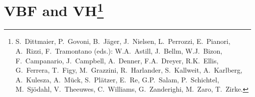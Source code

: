 \providecommand{\muR}{\mathswitch {\mu_{\mathrm{R}}}}
\providecommand{\muF}{\mathswitch {\mu_{\mathrm{F}}}}
\providecommand\DY{\mathrm{DY}}
\providecommand\DIS{\mathrm{DIS}}
\providecommand\VBF{\mathrm{VBF}}
\providecommand\NLL{\mathrm{NLL}}
\providecommand\VH{\mathrm{VH}}
\providecommand\WH{\mathrm{WH}}
\providecommand\ZH{\mathrm{ZH}}
\providecommand\ELWK{\mathrm{EW}}
\providecommand\HAWK{{\sc HAWK}}
\providecommand\MCFM{{\sc MCFM}}
\providecommand\VBFNLO{{\sc VBFNLO}}
\providecommand\VHNNLO{{\sc VH@NNLO}}
\providecommand\vhnnlo{{\sc VHNNLO}}
\providecommand\POWHEG{{\sc POWHEG}}
\providecommand\POWHEGBOX{{\sc POWHEG BOX}}
\providecommand\HERWIG{{\sc HERWIG}}
\providecommand\PYTHIA{{\sc PYTHIA}}
\providecommand\HDECAY{{\sc HDECAY}}
\providecommand{\kT}{\ensuremath{k\sb{\scriptstyle\mathrm{T}}}}
\providecommand\NNLOPS{{\sc NNLOPS}}
\providecommand\HVNNLO{{\sc HVNNLO}} 
\providecommand{\HVNNLOPS}{{\sc HVNNLOPS}} 
\providecommand{\HWJMINLOPS}{{\sc HWJ-MiNLO (Pythia8+hadr)}}
\providecommand{\HWNNLOPS}{{\sc HW-NNLOPS (Pythia8+hadr)}}
\providecommand{\HWNNLOPSshort}{{\sc HW-NNLOPS}}
\providecommand\DYNNLOPS{{\sc DYNNLOPS}}
\providecommand\MINLO{{\sc MiNLO}}
\providecommand\HWJMINLO{{\sc HWJ-MiNLO}}
\providecommand\FASTJET{{\sc FastJet}}
\providecommand\HNNLOPS{{\sc HNNLOPS}}
\providecommand\HW{{\sc HW}}
\providecommand\PhiHW{\Phi_{\scriptscriptstyle HW^*}} 
\providecommand\PhiHWsimp{\Phi_{\scriptscriptstyle HW}} 
\providecommand\thetacs{\theta^*}
\providecommand\phics{\phi^*}

\providecommand\ptw{p_{\scriptscriptstyle \mathrm{T,W}}}
\providecommand\ptwh{p_{\scriptscriptstyle \mathrm{T,HW}}}
\providecommand\ptjone{p_{\scriptscriptstyle
    \mathrm{T,j_{1}}}}
\providecommand\yjone{y_{\scriptscriptstyle
    \mathrm{j_{1}}}}

\providecommand\yh{y_{\scriptscriptstyle \mathrm{H}}}
\providecommand\ptw{p_{\scriptscriptstyle \mathrm{T,W}}}


\clearpage

\chapter{VBF and VH\footnote{%
S.~Dittmaier, P.~Govoni, B.~J\"ager, J.~Nielsen, L.~Perrozzi, E.~Pianori, A.~Rizzi, F.~Tramontano (eds.):
W.A.~Astill, J.~Bellm, W.J.~Bizon, F.~Campanario, J.~Campbell, A.~Denner, F.A.~Dreyer,
R.K.~Ellis, G.~Ferrera, T.~Figy, M.~Grazzini,
R.~Harlander, S.~Kallweit, A.~Karlberg, A.~Kulesza, A.~M\"uck, S.~Pl\"atzer, E.~Re, G.P.~Salam,
P.~Schichtel, M.~Sj\"odahl, V.~Theeuwes, C.~Williams, G.~Zanderighi, M.~Zaro, T.~Zirke.}
}
\label{chap:VBF+VH}

